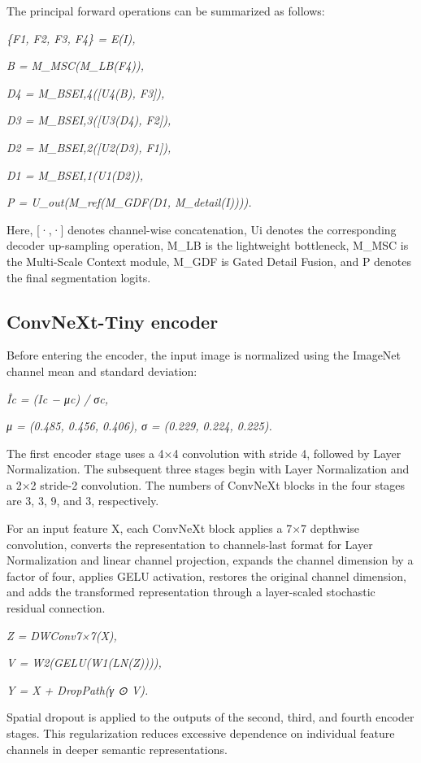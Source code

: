 The principal forward operations can be summarized as follows:

\emph{\{F1, F2, F3, F4\} = E(I),}

\emph{B = M\_MSC(M\_LB(F4)),}

\emph{D4 = M\_BSEI,4({[}U4(B), F3{]}),}

\emph{D3 = M\_BSEI,3({[}U3(D4), F2{]}),}

\emph{D2 = M\_BSEI,2({[}U2(D3), F1{]}),}

\emph{D1 = M\_BSEI,1(U1(D2)),}

\emph{P = U\_out(M\_ref(M\_GDF(D1, M\_detail(I)))).}

Here, {[}·,·{]} denotes channel-wise concatenation, Ui denotes the
corresponding decoder up-sampling operation, M\_LB is the lightweight
bottleneck, M\_MSC is the Multi-Scale Context module, M\_GDF is Gated
Detail Fusion, and P denotes the final segmentation logits.

\subsection{\texorpdfstring{ ConvNeXt-Tiny
encoder}{ ConvNeXt-Tiny encoder}}\label{convnext-tiny-encoder}

Before entering the encoder, the input image is normalized using the
ImageNet channel mean and standard deviation:

\emph{Îc = (Ic − μc) / σc,}

\emph{μ = (0.485, 0.456, 0.406), σ = (0.229, 0.224, 0.225).}

The first encoder stage uses a 4×4 convolution with stride 4, followed
by Layer Normalization. The subsequent three stages begin with Layer
Normalization and a 2×2 stride-2 convolution. The numbers of ConvNeXt
blocks in the four stages are 3, 3, 9, and 3, respectively.

For an input feature X, each ConvNeXt block applies a 7×7 depthwise
convolution, converts the representation to channels-last format for
Layer Normalization and linear channel projection, expands the channel
dimension by a factor of four, applies GELU activation, restores the
original channel dimension, and adds the transformed representation
through a layer-scaled stochastic residual connection.

\emph{Z = DWConv7×7(X),}

\emph{V = W2(GELU(W1(LN(Z)))),}

\emph{Y = X + DropPath(γ ⊙ V).}

Spatial dropout is applied to the outputs of the second, third, and
fourth encoder stages. This regularization reduces excessive dependence
on individual feature channels in deeper semantic representations.

